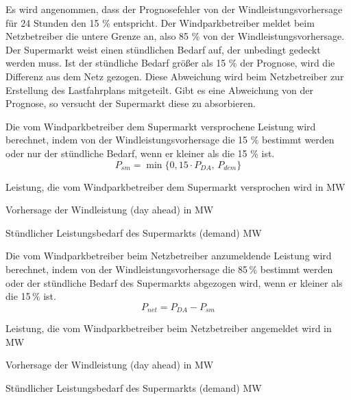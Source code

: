Es wird angenommen, dass der Prognosefehler von der Windleistungsvorhersage
f\"ur 24 Stunden den 15 \% entspricht. Der Windparkbetreiber meldet beim
Netzbetreiber die untere Grenze an, also 85 \% von der Windleistungsvorhersage.
Der Supermarkt weist einen st\"undlichen Bedarf auf, der unbedingt gedeckt
werden muss. Ist der st\"undliche Bedarf gr\"o\ss er als 15 \% der Prognose,
wird die Differenz aus dem Netz gezogen. Diese Abweichung wird beim
Netzbetreiber zur Erstellung des Lastfahrplans mitgeteilt. Gibt es eine
Abweichung von der
Prognose, so versucht der Supermarkt diese zu absorbieren.

Die vom Windparkbetreiber dem Supermarkt versprochene Leistung wird berechnet,
indem von der Windleistungsvorhersage die 15 \% bestimmt werden oder nur der
st\"undliche Bedarf, wenn er kleiner als die 15 \% ist.
\begin{equation}
	P_{sm} = \min \{ 0,15 \cdot P_{DA},\, P_{dem} \} 
	\label{eq:psm}
\end{equation}

\begin{description}[\dth]
	\item[$P_{sm}$] Leistung, die vom Windparkbetreiber dem Supermarkt
	versprochen wird in MW
	\item[$P_{DA}$] Vorhersage der Windleistung (day ahead) in MW
	\item[$P_{dem}$] St\"undlicher Leistungsbedarf des Supermarkts (demand)
	MW
\end{description}
\vspace{0.5cm}

Die vom Windparkbetreiber beim Netzbetreiber anzumeldende Leistung wird
berechnet, indem von der Windleistungsvorhersage die 85\,\% bestimmt werden
oder der st\"undliche Bedarf des Supermarkts abgezogen wird, wenn er kleiner
als die 15\,\% ist.
\begin{equation}
	P_{net} = P_{DA} - P_{sm}
	\label{eq:pnet}
\end{equation}

\begin{description}[\dth]
	\item[$P_{net}$] Leistung, die vom Windparkbetreiber beim Netzbetreiber
	angemeldet wird in MW
	\item[$P_{DA}$] Vorhersage der Windleistung (day ahead) in MW
	\item[$P_{dem}$] St\"undlicher Leistungsbedarf des Supermarkts (demand)
	MW
 \end{description} \vspace{0.5cm}


